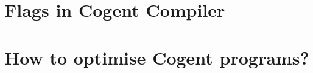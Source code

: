 \documentclass[a4paper]{article}
\newcommand{\cogent}{Cogent\xspace}
\begin{document}
\section{Flags in \cogent Compiler}

\section{How to optimise \cogent programs?}

%
\end{document}
